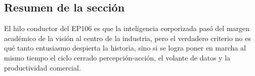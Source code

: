 \subsection{Resumen de la sección}

El hilo conductor del EP106 es que la inteligencia corporizada pasó del margen académico de la visión al centro de la industria, pero el verdadero criterio no es qué tanto entusiasmo despierta la historia, sino si se logra poner en marcha al mismo tiempo el ciclo cerrado percepción-acción, el volante de datos y la productividad comercial.
